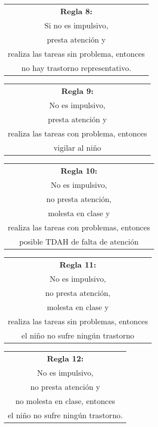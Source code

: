 \documentclass[letterpaper,12pt]{article}
\begin{document}
\begin{center}
	\begin{tabular}{|c|}
		\hline 
		\textbf{Regla 8:} \\
		Si no es impulsivo,\\
		presta atención y\\
		realiza las tareas sin problema, entonces\\
		no hay trastorno representativo.\\
		\hline 
		\end{tabular} 
\end{center}	
\begin{center}
	\begin{tabular}{|c|}
		\hline 
		\textbf{Regla 9:} \\
		No es impulsivo,\\
		presta atención y\\
		realiza las tareas con problema, entonces\\
		vigilar al niño\\
		\hline 
			\end{tabular} 
	\end{center}
\begin{center}
	\begin{tabular}{|c|}
		\hline 
		\textbf{Regla 10:} \\
		No es impulsivo,\\
		no presta atención,\\
		molesta en clase y\\
		realiza las tareas con problemas, entonces\\
		posible TDAH de falta de atención\\
		\hline 
		\end{tabular} 
	\end{center}
\begin{center}
	\begin{tabular}{|c|}
		\hline 
		\textbf{Regla 11:} \\
		No es impulsivo,\\
		no presta atención,\\
		molesta en clase y\\
		realiza las tareas sin problemas, entonces\\
		el niño no sufre ningún trastorno\\
		\hline 
		\end{tabular} 
	\end{center}
\begin{center}
	\begin{tabular}{|c|}
		\hline 
		\textbf{Regla 12:} \\
		No es impulsivo,\\
		no presta atención y\\
		no molesta en clase, entonces\\
		el niño no sufre ningún trastorno. \\
		\hline 
		\end{tabular} 
	\end{center}
\end{document}
